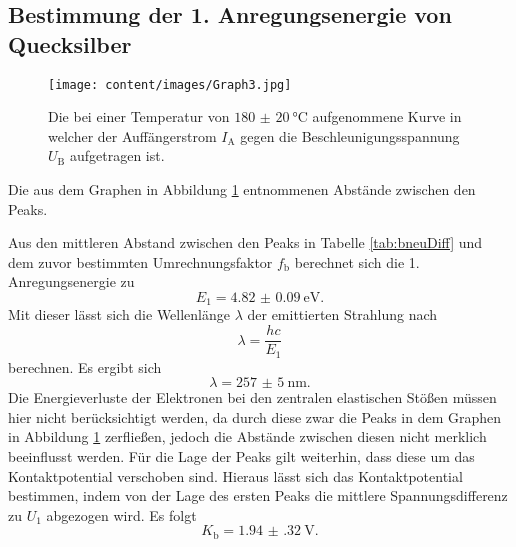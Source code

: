 \subsection{Bestimmung der 1. Anregungsenergie von Quecksilber}
\begin{figure}
	\centering
	\caption{Die bei einer Temperatur von $\SI{180(20)}{\degreeCelsius}$ aufgenommene Kurve in welcher der Auffängerstrom $I_\text{A}$ gegen die Beschleunigungsspannung $U_\text{B}$ aufgetragen ist.}
	\texttt{[image: content/images/Graph3.jpg]}
	\label{fig:b}
\end{figure}
\begin{table}
	\caption{Die aus dem Graphen in Abbildung \ref{fig:b} entnommenen Abstände zwischen den Peaks.}
	\centering
	
\end{table}
Aus den mittleren Abstand zwischen den Peaks in Tabelle \ref{tab:bneuDiff} und dem zuvor bestimmten Umrechnungsfaktor $f_\text{b}$ berechnet sich die 1. Anregungsenergie zu
\begin{displaymath}
	E_1=\SI{4.82(9)}{\electronvolt}\text{.}
\end{displaymath}
Mit dieser lässt sich die Wellenlänge $\lambda$ der emittierten Strahlung nach
\begin{equation}
\lambda = \frac{h  c}{E_1}
\end{equation}
berechnen.
Es ergibt sich
\begin{displaymath}
\lambda=\SI{257(5)}{\nano\meter}\text{.}
\end{displaymath}
Die Energieverluste der Elektronen bei den zentralen elastischen Stößen müssen hier nicht berücksichtigt werden, da durch diese zwar die Peaks in dem Graphen in Abbildung \ref{fig:b} zerfließen, jedoch die Abstände zwischen diesen nicht merklich beeinflusst werden. Für die Lage der Peaks gilt weiterhin, dass diese um das Kontaktpotential verschoben sind. Hieraus lässt sich das Kontaktpotential bestimmen, indem von der Lage des ersten Peaks die mittlere Spannungsdifferenz zu $U_1$ abgezogen wird. Es folgt
\begin{displaymath}
K_\text{b}=\SI{1.94(32)}{\volt}\text{.}
\end{displaymath}


